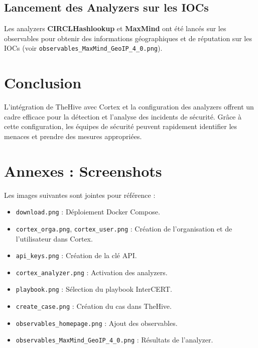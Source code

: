 \documentclass{article}
\begin{document}
\subsection{Lancement des Analyzers sur les IOCs}
Les analyzers \textbf{CIRCLHashlookup} et \textbf{MaxMind} ont été lancés sur les observables pour obtenir des informations géographiques et de réputation sur les IOCs (voir \texttt{observables\_MaxMind\_GeoIP\_4\_0.png}).

\section*{Conclusion}
L'intégration de TheHive avec Cortex et la configuration des analyzers offrent un cadre efficace pour la détection et l’analyse des incidents de sécurité. Grâce à cette configuration, les équipes de sécurité peuvent rapidement identifier les menaces et prendre des mesures appropriées.

\section*{Annexes : Screenshots}
Les images suivantes sont jointes pour référence :
\begin{itemize}
    \item \texttt{download.png} : Déploiement Docker Compose.
    \item \texttt{cortex\_orga.png}, \texttt{cortex\_user.png} : Création de l'organisation et de l'utilisateur dans Cortex.
    \item \texttt{api\_keys.png} : Création de la clé API.
    \item \texttt{cortex\_analyzer.png} : Activation des analyzers.
    \item \texttt{playbook.png} : Sélection du playbook InterCERT.
    \item \texttt{create\_case.png} : Création du cas dans TheHive.
    \item \texttt{observables\_homepage.png} : Ajout des observables.
    \item \texttt{observables\_MaxMind\_GeoIP\_4\_0.png} : Résultats de l'analyzer.
\end{itemize}
\end{document}
